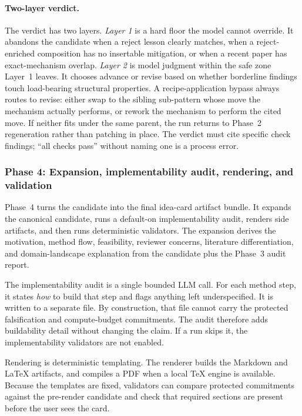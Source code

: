 \documentclass[10pt,a4paper]{article}
\begin{document}
\paragraph{Two-layer verdict.} The verdict has two layers. \emph{Layer 1} is a hard floor the model cannot override. It abandons the candidate when a reject lesson clearly matches, when a reject-enriched composition has no insertable mitigation, or when a recent paper has exact-mechanism overlap. \emph{Layer 2} is model judgment within the safe zone Layer~1 leaves. It chooses advance or revise based on whether borderline findings touch load-bearing structural properties. A recipe-application bypass always routes to revise: either swap to the sibling sub-pattern whose move the mechanism actually performs, or rework the mechanism to perform the cited move. If neither fits under the same parent, the run returns to Phase~2 regeneration rather than patching in place. The verdict must cite specific check findings; ``all checks pass'' without naming one is a process error.

\subsubsection{Phase 4: Expansion, implementability audit, rendering, and validation}

Phase~4 turns the candidate into the final idea-card artifact bundle. It expands the canonical candidate, runs a default-on implementability audit, renders side artifacts, and then runs deterministic validators. The expansion derives the motivation, method flow, feasibility, reviewer concerns, literature differentiation, and domain-landscape explanation from the candidate plus the Phase~3 audit report.

The implementability audit is a single bounded LLM call. For each method step, it states \emph{how} to build that step and flags anything left underspecified. It is written to a separate file. By construction, that file cannot carry the protected falsification and compute-budget commitments. The audit therefore adds buildability detail without changing the claim. If a run skips it, the implementability validators are not enabled.

Rendering is deterministic templating. The renderer builds the Markdown and LaTeX artifacts, and compiles a PDF when a local TeX engine is available. Because the templates are fixed, validators can compare protected commitments against the pre-render candidate and check that required sections are present before the user sees the card.
\end{document}
